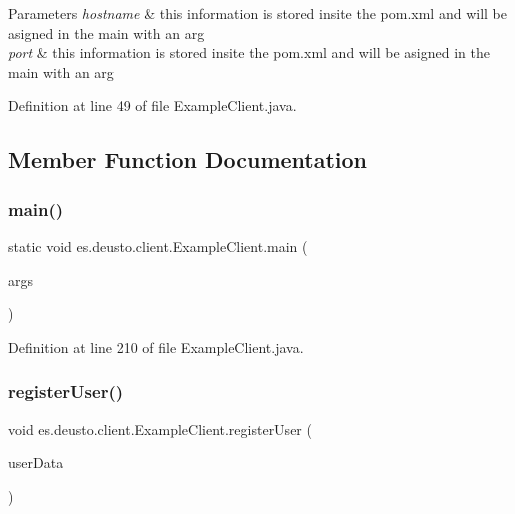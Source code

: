 \begin{DoxyParams}{Parameters}
{\em hostname} & this information is stored insite the pom.\+xml and will be asigned in the main with an arg \\
\hline
{\em port} & this information is stored insite the pom.\+xml and will be asigned in the main with an arg \\
\hline
\end{DoxyParams}


Definition at line 49 of file Example\+Client.\+java.



\subsection{Member Function Documentation}
\mbox{\label{classes_1_1deusto_1_1client_1_1_example_client_a9eadbc017db92b83cad1f6b72c10bae2}} 
\subsubsection{\texorpdfstring{main()}{main()}}
{\footnotesize\ttfamily static void es.\+deusto.\+client.\+Example\+Client.\+main (\begin{DoxyParamCaption}\item[{String \mbox{[}$\,$\mbox{]}}]{args }\end{DoxyParamCaption})\hspace{0.3cm}{\ttfamily [static]}}



Definition at line 210 of file Example\+Client.\+java.

\mbox{\label{classes_1_1deusto_1_1client_1_1_example_client_a1c17371c17dde2b7664f2ad17ee79e4b}} 
\subsubsection{\texorpdfstring{register\+User()}{registerUser()}}
{\footnotesize\ttfamily void es.\+deusto.\+client.\+Example\+Client.\+register\+User (\begin{DoxyParamCaption}\item[{\hyperlink{classes_1_1deusto_1_1serialization_1_1_user_data}{User\+Data}}]{user\+Data }\end{DoxyParamCaption})}

